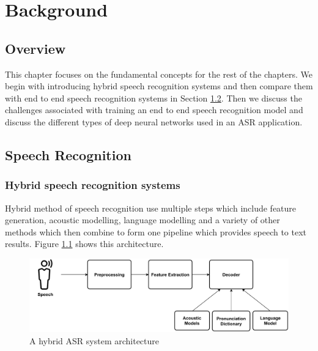 \chapter{Background}
\label{chapter:background} 

\section{Overview}
This chapter focuses on the fundamental concepts for the rest of the chapters. We begin with introducing hybrid speech recognition systems and then compare them with end to end speech recognition systems in Section \ref{section:asr}. Then we discuss the challenges associated with training an end to end speech recognition model and discuss the different types of deep neural networks used in an ASR application.

\section{Speech Recognition}
\label{section:asr}

\subsection{Hybrid speech recognition systems}
\label{section:hybridasr}
Hybrid method of speech recognition use multiple steps which include feature generation, acoustic modelling, language modelling and a variety of other methods which then combine to form one pipeline which provides speech to text results. Figure \ref{fig:hyrid_asr_model} shows this architecture.

\begin{figure}[ht]
  \begin{center}
    \includegraphics[width=\textwidth]{images/Hybrid ASR System.pdf} 
    \caption{A hybrid ASR system architecture}
    \label{fig:hyrid_asr_model}
  \end{center}
\end{figure}

